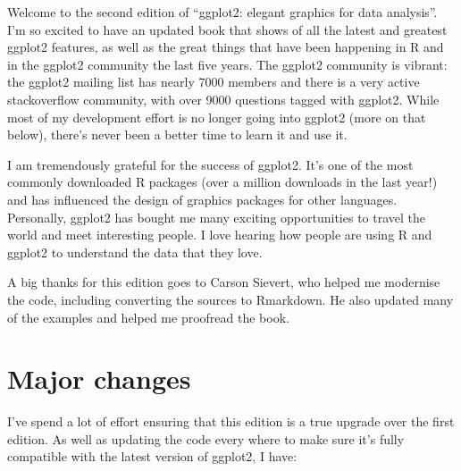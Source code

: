 \preface

Welcome to the second edition of ``ggplot2: elegant graphics for data
analysis''. I'm so excited to have an updated book that shows of all the
latest and greatest ggplot2 features, as well as the great things that
have been happening in R and in the ggplot2 community the last five
years. The ggplot2 community is vibrant: the ggplot2 mailing list has
nearly 7000 members and there is a very active stackoverflow community,
with over 9000 questions tagged with ggplot2. While most of my
development effort is no longer going into ggplot2 (more on that below),
there's never been a better time to learn it and use it.

I am tremendously grateful for the success of ggplot2. It's one of the
most commonly downloaded R packages (over a million downloads in the
last year!) and has influenced the design of graphics packages for other
languages. Personally, ggplot2 has bought me many exciting opportunities
to travel the world and meet interesting people. I love hearing how
people are using R and ggplot2 to understand the data that they love.

A big thanks for this edition goes to Carson Sievert, who helped me
modernise the code, including converting the sources to Rmarkdown. He
also updated many of the examples and helped me proofread the book.

\section*{Major changes}

I've spend a lot of effort ensuring that this edition is a true upgrade
over the first edition. As well as updating the code every where to make
sure it's fully compatible with the latest version of ggplot2, I have:

